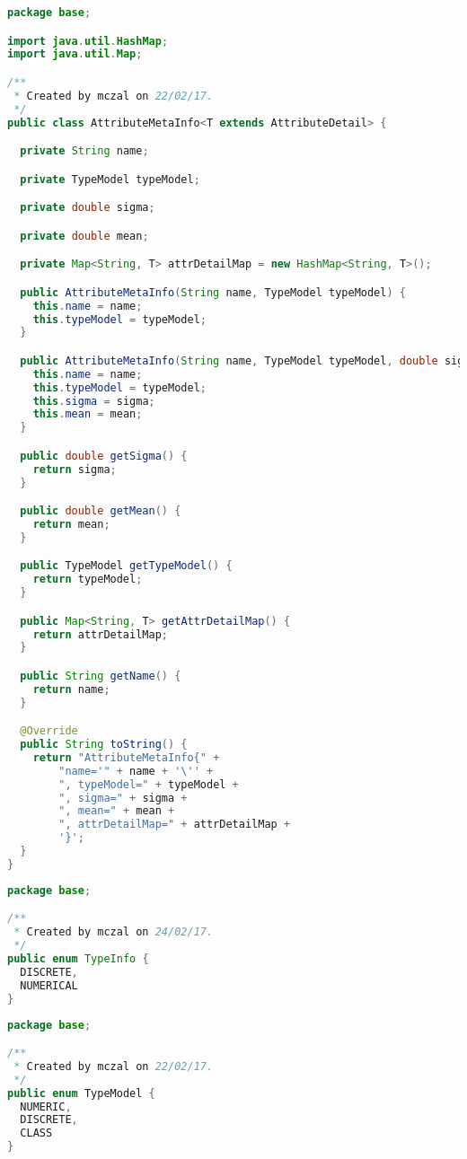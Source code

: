 \begin{lstlisting}[language=Java,basicstyle=\tiny,caption=AttributeMetaInfo.java]
package base;

import java.util.HashMap;
import java.util.Map;

/**
 * Created by mczal on 22/02/17.
 */
public class AttributeMetaInfo<T extends AttributeDetail> {

  private String name;

  private TypeModel typeModel;

  private double sigma;

  private double mean;

  private Map<String, T> attrDetailMap = new HashMap<String, T>();

  public AttributeMetaInfo(String name, TypeModel typeModel) {
    this.name = name;
    this.typeModel = typeModel;
  }

  public AttributeMetaInfo(String name, TypeModel typeModel, double sigma, double mean) {
    this.name = name;
    this.typeModel = typeModel;
    this.sigma = sigma;
    this.mean = mean;
  }

  public double getSigma() {
    return sigma;
  }

  public double getMean() {
    return mean;
  }

  public TypeModel getTypeModel() {
    return typeModel;
  }

  public Map<String, T> getAttrDetailMap() {
    return attrDetailMap;
  }

  public String getName() {
    return name;
  }

  @Override
  public String toString() {
    return "AttributeMetaInfo{" +
        "name='" + name + '\'' +
        ", typeModel=" + typeModel +
        ", sigma=" + sigma +
        ", mean=" + mean +
        ", attrDetailMap=" + attrDetailMap +
        '}';
  }
}
\end{lstlisting}


\begin{lstlisting}[language=Java,basicstyle=\tiny,caption=TypeInfo.java]
package base;

/**
 * Created by mczal on 24/02/17.
 */
public enum TypeInfo {
  DISCRETE,
  NUMERICAL
}
\end{lstlisting}


\begin{lstlisting}[language=Java,basicstyle=\tiny,caption=TypeModel.java]
package base;

/**
 * Created by mczal on 22/02/17.
 */
public enum TypeModel {
  NUMERIC,
  DISCRETE,
  CLASS
}
\end{lstlisting}


